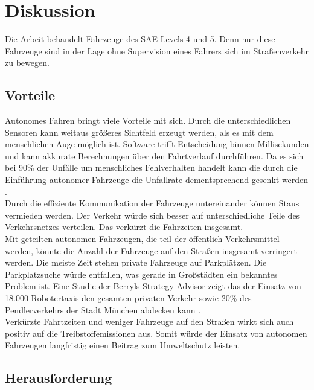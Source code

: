 \section{Diskussion}
\label{sec:diskussion}

Die Arbeit behandelt Fahrzeuge des SAE-Levels 4 und 5. Denn nur diese Fahrzeuge sind in der Lage ohne Supervision eines Fahrers sich im Straßenverkehr zu bewegen. 

\subsection{Vorteile}

Autonomes Fahren bringt viele Vorteile mit sich. Durch die unterschiedlichen Sensoren kann weitaus größeres Sichtfeld erzeugt werden, als es mit dem menschlichen Auge möglich ist. Software trifft Entscheidung binnen Millisekunden und kann akkurate Berechnungen über den Fahrtverlauf durchführen. 
Da es sich bei 90\% der Unfälle um menschliches Fehlverhalten handelt kann die durch die Einführung autonomer Fahrzeuge die Unfallrate dementsprechend gesenkt werden \cite{roadSafty}.\\

Durch die effiziente Kommunikation der Fahrzeuge untereinander können Staus vermieden werden. Der Verkehr würde sich besser auf unterschiedliche Teile des Verkehrsnetzes verteilen. Das verkürzt die Fahrzeiten insgesamt. \\

Mit geteilten autonomen Fahrzeugen, die teil der öffentlich Verkehrsmittel werden, könnte die Anzahl der Fahrzeuge auf den Straßen insgesamt verringert werden. Die meiste Zeit stehen private Fahrzeuge auf Parkplätzen. Die Parkplatzsuche würde entfallen, was gerade in Großstädten ein bekanntes Problem ist. Eine Studie der Berryls Strategy Advisor zeigt das der Einsatz von 18.000 Robotertaxis den gesamten privaten Verkehr sowie 20\% des Pendlerverkehrs der Stadt München abdecken kann \cite{advisors2017simulation}.\\

Verkürzte Fahrtzeiten und weniger Fahrzeuge auf den Straßen wirkt sich auch positiv auf die Treibstoffemissionen aus. Somit würde der Einsatz von autonomen Fahrzeugen langfristig einen Beitrag zum Umweltschutz leisten.\\

\subsection{Herausforderung}

